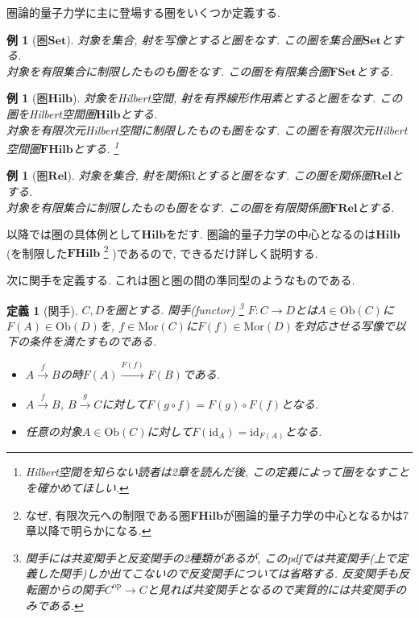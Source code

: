 \documentclass[a4paper,12pt]{ltjsarticle}
\theoremstyle{break}
\newtheorem{defn}[thm]{定義}
\newtheorem{eg}[thm]{例}
\newcommand{\cset}{\mathbf{Set}}
\newcommand{\fset}{\mathbf{FSet}}
\newcommand{\rel}{\mathbf{Rel}}
\newcommand{\frel}{\mathbf{FRel}}
\newcommand{\hilb}{\mathbf{Hilb}}
\newcommand{\fhilb}{\mathbf{FHilb}}
\newcommand{\mrr}{\mathrm{R}}
\newcommand{\Ob}{\mathrm{Ob}}
\newcommand{\Mor}{\mathrm{Mor}}
\newcommand{\Op}{\mathrm{op}}
\newcommand{\xr}[1]{\xrightarrow{#1}}
\newcommand{\id}{\mathrm{id}}
\numberwithin{equation}{section}
\begin{document}
圏論的量子力学に主に登場する圏をいくつか定義する. 

\begin{eg}[圏$\cset$]
  対象を集合, 射を写像とすると圏をなす. 
  この圏を集合圏$\cset$とする. \\
  対象を有限集合に制限したものも圏をなす. 
  この圏を有限集合圏$\fset$とする. 
\end{eg}  

\begin{eg}[圏$\hilb$]
  対象をHilbert空間, 射を有界線形作用素とすると圏をなす. 
  この圏をHilbert空間圏$\hilb$とする. \\
  対象を有限次元Hilbert空間に制限したものも圏をなす. 
  この圏を有限次元Hilbert空間圏$\fhilb$とする. 
  \footnote{
      Hilbert空間を知らない読者は2章を読んだ後, この定義によって圏をなすことを確かめてほしい.
    }
\end{eg} 

\begin{eg}[圏$\rel$]
  対象を集合, 射を関係$\mrr$とすると圏をなす. 
  この圏を関係圏$\rel$とする. \\
  対象を有限集合に制限したものも圏をなす. 
  この圏を有限関係圏$\frel$とする. 
\end{eg}  

以降では圏の具体例として$\hilb$をだす.   
圏論的量子力学の中心となるのは$\hilb$(を制限した$\fhilb$
\footnote{
    なぜ, 有限次元への制限である圏$\fhilb$が圏論的量子力学の中心となるかは7章以降で明らかになる.
  }
  )であるので, できるだけ詳しく説明する. 

次に関手を定義する. 
これは圏と圏の間の準同型のようなものである. 

\begin{defn}[関手]
  $C, D$を圏とする. 
  関手(functor)
  \footnote{
    関手には共変関手と反変関手の2種類があるが, このpdfでは共変関手(上で定義した関手)しか出てこないので反変関手については省略する. 
    反変関手も反転圏からの関手$C^\Op \to C$と見れば共変関手となるので実質的には共変関手のみである.  
  }
  $F: C \to D$とは$A \in \Ob(C)$に$F(A) \in \Ob(D)$を, $f \in \Mor(C)$に$F(f) \in \Mor(D)$を対応させる写像で以下の条件を満たすものである. 
  \begin{itemize}
    \item $A \xr{f} B$の時$F(A) \xr{F(f)} F(B)$である. 
    \item $A \xr{f} B$, $B \xr{g} C$に対して$F(g \circ f) = F(g) \circ F(f)$となる.
    \item 任意の対象$A \in \Ob(C)$に対して$F(\id_A) = \id_{F(A)}$となる. 
  \end{itemize}
\end{defn}
\end{document}
